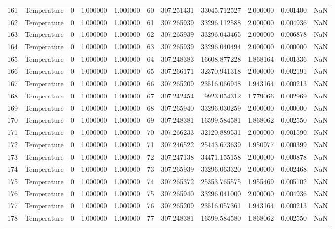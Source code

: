 \begin{tabular}{llrrrrrrrrr}
161 & Temperature & 0 & 1.000000 & 1.000000 & 60 & 307.251431 & 33045.712527 & 2.000000 & 0.001400 & NaN \\
162 & Temperature & 0 & 1.000000 & 1.000000 & 61 & 307.265939 & 33296.112588 & 2.000000 & 0.004936 & NaN \\
163 & Temperature & 0 & 1.000000 & 1.000000 & 62 & 307.265939 & 33296.043465 & 2.000000 & 0.006878 & NaN \\
164 & Temperature & 0 & 1.000000 & 1.000000 & 63 & 307.265939 & 33296.040494 & 2.000000 & 0.000000 & NaN \\
165 & Temperature & 0 & 1.000000 & 1.000000 & 64 & 307.248383 & 16608.877228 & 1.868164 & 0.001336 & NaN \\
166 & Temperature & 0 & 1.000000 & 1.000000 & 65 & 307.266171 & 32370.941318 & 2.000000 & 0.002191 & NaN \\
167 & Temperature & 0 & 1.000000 & 1.000000 & 66 & 307.265209 & 23516.066948 & 1.943164 & 0.000213 & NaN \\
168 & Temperature & 0 & 1.000000 & 1.000000 & 67 & 307.242454 & 9923.054312 & 1.779066 & 0.002969 & NaN \\
169 & Temperature & 0 & 1.000000 & 1.000000 & 68 & 307.265940 & 33296.030259 & 2.000000 & 0.000000 & NaN \\
170 & Temperature & 0 & 1.000000 & 1.000000 & 69 & 307.248381 & 16599.584581 & 1.868062 & 0.002550 & NaN \\
171 & Temperature & 0 & 1.000000 & 1.000000 & 70 & 307.266233 & 32120.889531 & 2.000000 & 0.001590 & NaN \\
172 & Temperature & 0 & 1.000000 & 1.000000 & 71 & 307.246522 & 25443.673639 & 1.950977 & 0.000399 & NaN \\
173 & Temperature & 0 & 1.000000 & 1.000000 & 72 & 307.247138 & 34471.155158 & 2.000000 & 0.000878 & NaN \\
174 & Temperature & 0 & 1.000000 & 1.000000 & 73 & 307.265939 & 33296.063320 & 2.000000 & 0.002468 & NaN \\
175 & Temperature & 0 & 1.000000 & 1.000000 & 74 & 307.265372 & 25353.765575 & 1.955469 & 0.005102 & NaN \\
176 & Temperature & 0 & 1.000000 & 1.000000 & 75 & 307.265940 & 33296.041000 & 2.000000 & 0.004936 & NaN \\
177 & Temperature & 0 & 1.000000 & 1.000000 & 76 & 307.265209 & 23516.057361 & 1.943164 & 0.000213 & NaN \\
178 & Temperature & 0 & 1.000000 & 1.000000 & 77 & 307.248381 & 16599.584580 & 1.868062 & 0.002550 & NaN \\

\end{tabular}
